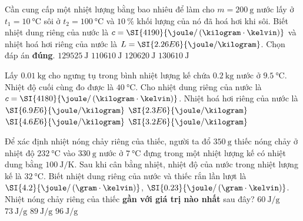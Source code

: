 \begin{ex}
	Cần cung cấp một nhiệt lượng bằng bao nhiêu để làm cho $m=\SI{200}{\gram}$ nước lấy ở $t_1=\SI{10}{\celsius}$ sôi ở $t_2=\SI{100}{\celsius}$ và $\SI{10}{\percent}$ khối lượng của nó đã hoá hơi khi sôi. Biết nhiệt dung riêng của nước là $c=\SI{4190}{\joule/\left(\kilogram\cdot\kelvin\right)}$ và nhiệt hoá hơi riêng của nước là $L=\SI{2.26E6}{\joule/\kilogram}$. Chọn đáp án \textbf{đúng}.
	\choice
	{$\SI{129525}{\joule}$}
	{$\SI{110610}{\joule}$}
	{\True $\SI{120620}{\joule}$}
	{$\SI{130610}{\joule}$}
\end{ex}
\begin{ex}
	Lấy $\SI{0.01}{\kilogram}$ cho ngưng tụ trong bình nhiệt lượng kế chứa $\SI{0.2}{\kilogram}$ nước ở $\SI{9.5}{\celsius}$. Nhiệt độ cuối cùng đo được là $\SI{40}{\celsius}$. Cho nhiệt dung riêng của nước là $c=\SI{4180}{\joule/\left(\kilogram\cdot\kelvin\right)}$. Nhiệt hoá hơi riêng của nước là
	\choice
	{$\SI{6.9E6}{\joule/\kilogram}$}
	{\True $\SI{2.3E6}{\joule/\kilogram}$}
	{$\SI{4.6E6}{\joule/\kilogram}$}
	{$\SI{3.2E6}{\joule/\kilogram}$}
\end{ex}
\begin{ex}
	Để xác định nhiệt nóng chảy riêng của thiếc, người ta đổ $\SI{350}{\gram}$ thiếc nóng chảy ở nhiệt độ $\SI{232}{\celsius}$ vào $\SI{330}{\gram}$ nước ở $\SI{7}{\celsius}$ đựng trong một nhiệt lượng kế có nhiệt dung bằng $\SI{100}{\joule/\kelvin}$. Sau khi cân bằng nhiệt, nhiệt độ của nước trong nhiệt lượng kế là $\SI{32}{\celsius}$. Biết nhiệt dung riêng của nước và thiếc rắn lần lượt là $\SI{4.2}{\joule/\left(\gram\cdot\kelvin\right)}$, $\SI{0.23}{\joule/\left(\gram\cdot\kelvin\right)}$. Nhiệt nóng chảy riêng của thiếc \textbf{gần với giá trị nào nhất} sau đây?
	\choice
	{\True $\SI{60}{\joule/\gram}$}
	{$\SI{73}{\joule/\gram}$}
	{$\SI{89}{\joule/\gram}$}
	{$\SI{96}{\joule/\gram}$}
\end{ex}

